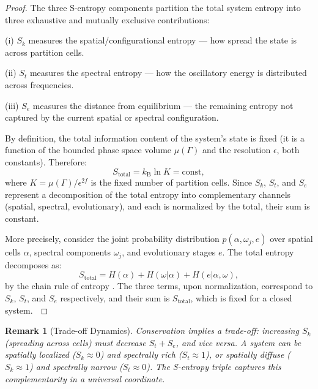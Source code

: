 \documentclass[11pt,twocolumn,a4paper]{article}
\newtheorem{remark}[theorem]{Remark}
\newcommand{\kb}{k_{\mathrm{B}}}
\newcommand{\Sk}{S_k}
\newcommand{\St}{S_t}
\newcommand{\Se}{S_e}
\begin{document}
\begin{proof}
The three S-entropy components partition the total system entropy into
three exhaustive and mutually exclusive contributions:

(i) $\Sk$ measures the spatial/configurational entropy --- how spread
the state is across partition cells.

(ii) $\St$ measures the spectral entropy --- how the oscillatory
energy is distributed across frequencies.

(iii) $\Se$ measures the distance from equilibrium --- the remaining
entropy not captured by the current spatial or spectral configuration.

By definition, the total information content of the system's state is
fixed (it is a function of the bounded phase space volume
$\mu(\Gamma)$ and the resolution $\epsilon$, both constants).
Therefore:
\begin{equation}
S_{\mathrm{total}} = \kb \ln K = \text{const},
\end{equation}
where $K = \mu(\Gamma)/\epsilon^{2f}$ is the fixed number of
partition cells. Since $\Sk$, $\St$, and $\Se$ represent a
decomposition of the total entropy into complementary channels (spatial,
spectral, evolutionary), and each is normalized by the total,
their sum is constant.

More precisely, consider the joint probability distribution
$p(\alpha, \omega_j, e)$ over spatial cells $\alpha$, spectral
components $\omega_j$, and evolutionary stages $e$. The total
entropy decomposes as:
\begin{equation}
S_{\mathrm{total}} = H(\alpha) + H(\omega|\alpha)
  + H(e|\alpha,\omega),
\end{equation}
by the chain rule of entropy \citep{cover2006}. The three terms,
upon normalization, correspond to $\Sk$, $\St$, and $\Se$ respectively,
and their sum is $S_{\mathrm{total}}$, which is fixed for a closed
system. $\qedhere$
\end{proof}

\begin{remark}[Trade-off Dynamics]
Conservation implies a trade-off: increasing $\Sk$ (spreading across
cells) must decrease $\St + \Se$, and vice versa. A system can be
spatially localized ($\Sk \approx 0$) and spectrally rich
($\St \approx 1$), or spatially diffuse ($\Sk \approx 1$) and
spectrally narrow ($\St \approx 0$). The S-entropy triple captures
this complementarity in a universal coordinate.
\end{remark}
\end{document}

